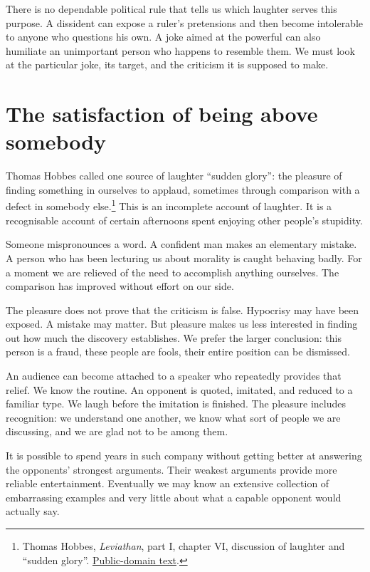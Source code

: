 \documentclass[12pt,a4paper]{book}
\begin{document}
There is no dependable political rule that tells us which laughter serves this purpose. A dissident can expose a ruler's pretensions and then become intolerable to anyone who questions his own. A joke aimed at the powerful can also humiliate an unimportant person who happens to resemble them. We must look at the particular joke, its target, and the criticism it is supposed to make.

\section*{The satisfaction of being above somebody}

Thomas Hobbes called one source of laughter ``sudden glory'': the pleasure of finding something in ourselves to applaud, sometimes through comparison with a defect in somebody else.\footnote{Thomas Hobbes, \emph{Leviathan}, part I, chapter VI, discussion of laughter and ``sudden glory''. \href{https://www.gutenberg.org/files/3207/3207-h/3207-h.htm}{Public-domain text}.} This is an incomplete account of laughter. It is a recognisable account of certain afternoons spent enjoying other people's stupidity.

Someone mispronounces a word. A confident man makes an elementary mistake. A person who has been lecturing us about morality is caught behaving badly. For a moment we are relieved of the need to accomplish anything ourselves. The comparison has improved without effort on our side.

The pleasure does not prove that the criticism is false. Hypocrisy may have been exposed. A mistake may matter. But pleasure makes us less interested in finding out how much the discovery establishes. We prefer the larger conclusion: this person is a fraud, these people are fools, their entire position can be dismissed.

An audience can become attached to a speaker who repeatedly provides that relief. We know the routine. An opponent is quoted, imitated, and reduced to a familiar type. We laugh before the imitation is finished. The pleasure includes recognition: we understand one another, we know what sort of people we are discussing, and we are glad not to be among them.

It is possible to spend years in such company without getting better at answering the opponents' strongest arguments. Their weakest arguments provide more reliable entertainment. Eventually we may know an extensive collection of embarrassing examples and very little about what a capable opponent would actually say.
\end{document}
